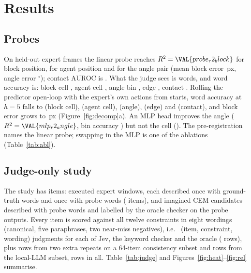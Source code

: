\documentclass[11pt]{article}
\newcommand{\jev}{Jev}
\begin{document}
\section{Results}
\subsection{Probes}\label{sec:probes}
On  held-out expert frames the linear probe reaches $R^2=\VAL{probe_r2_block}$ for block position,  for agent position and  for the angle pair (mean block error \,px, angle error $^\circ$); contact AUROC is . What the judge sees is words, and word accuracy is: block cell , agent cell , angle bin , edge , contact . Rolling the predictor open-loop with the expert's own actions from  starts, word accuracy at $h=5$ falls to  (block cell),  (agent cell),  (angle),  (edge) and  (contact), and block error grows to \,px (Figure~\ref{fig:decomp}a). An MLP head improves the angle ($R^2=\VAL{mlp_r2_angle}$, bin accuracy ) but not the cell (). The pre-registration names the linear probe; swapping in the MLP is one of the ablations (Table~\ref{tab:abl}).

\subsection{Judge-only study}\label{sec:judge}
The study has  items:  executed expert windows, each described once with ground-truth words and once with probe words ( items), and  imagined CEM candidates described with probe words and labelled by the oracle checker on the probe outputs. Every item is scored against all twelve constraints in eight wordings (canonical, five paraphrases, two near-miss negatives), i.e.\  (item, constraint, wording) judgments for each of \jev, the keyword checker and the oracle ( rows), plus  rows from two extra repeats on a 64-item consistency subset and  rows from the local-LLM subset,  rows in all. Table~\ref{tab:judge} and Figures~\ref{fig:heat}--\ref{fig:rel} summarise.
\end{document}
